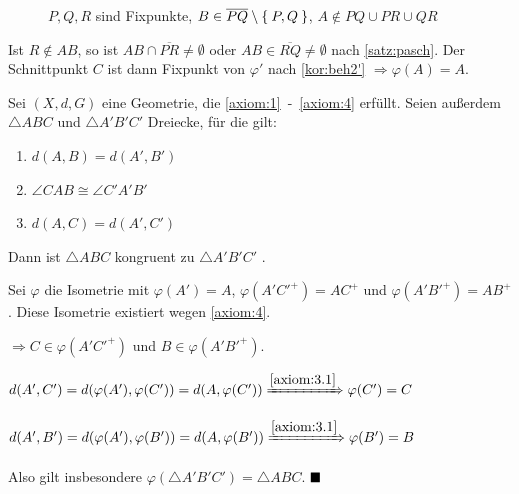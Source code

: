 \begin{beweis}
\begin{enumerate}[label=(Teil \roman*),ref=(Teil \roman*)]
        \begin{figure}[htp]
            \centering
            
            \caption{$P, Q, R$ sind Fixpunkte, $B \in \overline{PQ} \setminus \Set{P,Q}$, $A \notin PQ \cup PR \cup QR$}
            \label{fig:geometry-1}
        \end{figure}

        Ist $R \notin AB$, so ist $AB \cap \overline{PR} \neq \emptyset$
        oder $AB \in \overline{RQ} \neq \emptyset$ nach \cref{satz:pasch}.
        Der Schnittpunkt $C$ ist dann Fixpunkt von $\varphi'$
        nach \cref{kor:beh2'} $\Rightarrow \varphi(A) = A$.
    \end{enumerate}
\end{beweis}

\begin{bemerkung}%
    Sei $(X, d, G)$ eine Geometrie, die \ref{axiom:1}~-~\ref{axiom:4} erfüllt.
    Seien außerdem $\triangle ABC$ und $\triangle A'B'C'$ Dreiecke, für die gilt:
    \begin{enumerate}[label=(\roman*)]
        \item \label{bem:sws.i} $d(A, B) = d(A', B')$
        \item \label{bem:sws.ii} $\angle CAB \cong \angle C'A'B'$
        \item \label{bem:sws.iii} $d(A, C) = d(A', C')$
    \end{enumerate}

    Dann ist $\triangle ABC$ kongruent zu $\triangle A'B'C'$ .
\end{bemerkung}

\begin{beweis}
    Sei $\varphi$ die Isometrie mit $\varphi(A') = A$, $\varphi(A'C'^+) = AC^+$
    und $\varphi(A'B'^+) = AB^+$. Diese Isometrie existiert wegen \cref{axiom:4}.

    $\Rightarrow C \in \varphi(A'C'^+)$ und $B \in \varphi(A'B'^+)$.

    $d(A',C')= d(\varphi(A'), \varphi(C')) = d(A, \varphi(C')) \xRightarrow{\ref{axiom:3.1}} \varphi(C') = C$

    $d(A',B')= d(\varphi(A'), \varphi(B')) = d(A, \varphi(B')) \xRightarrow{\ref{axiom:3.1}} \varphi(B') = B$

    Also gilt insbesondere $\varphi(\triangle A'B'C') = \triangle ABC$. $\qed$
\end{beweis}
    
